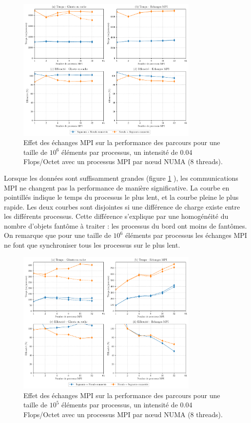 \begin{figure}
	\centering
	\includegraphics[width=0.8\textwidth]{img/bench_mesh_mpi_effet_comm_1e+06}
	\caption{Effet des échanges MPI sur la performance des parcours pour une taille de $10^6$ éléments par processus, un intensité de 0.04 Flops/Octet avec un processus MPI par nœud NUMA (8 threads).}
	\label{fig:bench_mesh_mpi_effet_comm_1e+06}
\end{figure}

Lorsque les données sont suffisamment grandes (figure \ref{fig:bench_mesh_mpi_effet_comm_1e+06} ), les communications MPI ne changent pas la performance de manière significative. La courbe en pointillés indique le temps du processus le plus lent, et la courbe pleine le plus rapide. Les deux courbes sont disjointes si une différence de charge existe entre les différents processus. Cette différence s'explique par une homogénéité du nombre d'objets fantôme à traiter : les processus du bord ont moins de fantômes. On remarque que pour une taille de $10^6$ éléments par processus les échanges MPI ne font que synchroniser tous les processus sur le plus lent.

\begin{figure}
	\centering
	\includegraphics[width=0.8\textwidth]{img/bench_mesh_mpi_effet_comm_1e+05}
	\caption{Effet des échanges MPI sur la performance des parcours pour une taille de $10^5$ éléments par processus, un intensité de 0.04 Flops/Octet avec un processus MPI par nœud NUMA (8 threads).}
	\label{fig:bench_mesh_mpi_effet_comm_1e+05}
\end{figure}

